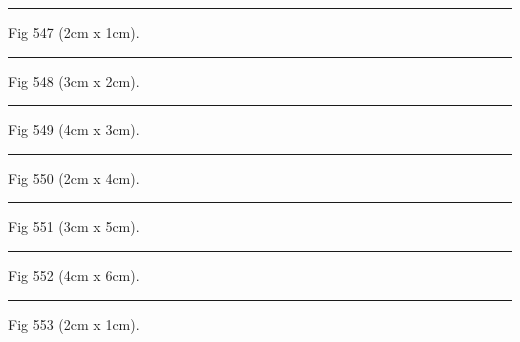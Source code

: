 \documentclass[a4paper,11pt]{article}
\begin{document}
\begin{swarmwrap}%
  \begin{minipage}[t]{2cm}
    \centering
    \rule{\linewidth}{1cm}
    {\footnotesize Fig 547 (2cm x 1cm).}
  \end{minipage}%
\end{swarmwrap}%
\swarmwrapnext
\lipsum[97]%

\begin{swarmwrap}%
  \begin{minipage}[t]{3cm}
    \centering
    \rule{\linewidth}{2cm}
    {\footnotesize Fig 548 (3cm x 2cm).}
  \end{minipage}%
\end{swarmwrap}%
\swarmwrapnext
\lipsum[98]%

\begin{swarmwrap}%
  \begin{minipage}[t]{4cm}
    \centering
    \rule{\linewidth}{3cm}
    {\footnotesize Fig 549 (4cm x 3cm).}
  \end{minipage}%
\end{swarmwrap}%
\swarmwrapnext
\lipsum[99]%

\begin{swarmwrap}%
  \begin{minipage}[t]{2cm}
    \centering
    \rule{\linewidth}{4cm}
    {\footnotesize Fig 550 (2cm x 4cm).}
  \end{minipage}%
\end{swarmwrap}%
\swarmwrapnext
\lipsum[100]%

\begin{swarmwrap}%
  \begin{minipage}[t]{3cm}
    \centering
    \rule{\linewidth}{5cm}
    {\footnotesize Fig 551 (3cm x 5cm).}
  \end{minipage}%
\end{swarmwrap}%
\swarmwrapnext
\lipsum[101]%

\begin{swarmwrap}%
  \begin{minipage}[t]{4cm}
    \centering
    \rule{\linewidth}{6cm}
    {\footnotesize Fig 552 (4cm x 6cm).}
  \end{minipage}%
\end{swarmwrap}%
\swarmwrapnext
\lipsum[102]%

\begin{swarmwrap}%
  \begin{minipage}[t]{2cm}
    \centering
    \rule{\linewidth}{1cm}
    {\footnotesize Fig 553 (2cm x 1cm).}
  \end{minipage}%
\end{swarmwrap}%
\swarmwrapnext
\lipsum[103]%
\end{document}
